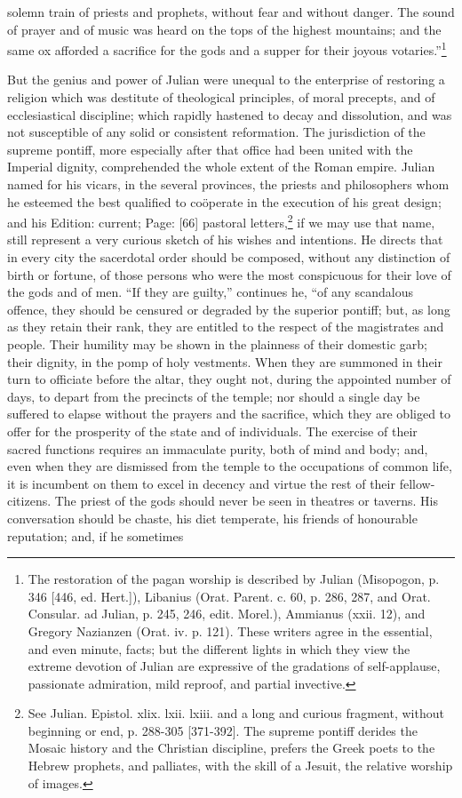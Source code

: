 solemn train of priests and prophets, without fear and without danger. The sound of prayer and of music was heard on the tops of the highest mountains; and the same ox afforded a sacrifice for the gods and a supper for their joyous votaries.\texthebrew{}”\footnote{The restoration of the pagan worship is described by Julian (Misopogon, p. 346 [446, ed. Hert.]), Libanius (Orat. Parent. c. 60, p. 286, 287, and Orat. Consular. ad Julian, p. 245, 246, edit. Morel.), Ammianus (xxii. 12), and Gregory Nazianzen (Orat. iv. p. 121). These writers agree in the essential, and even minute, facts; but the different lights in which they view the extreme devotion of Julian are expressive of the gradations of self-applause, passionate admiration, mild reproof, and partial invective.}

But the genius and power of Julian were unequal to the enterprise of restoring a religion which was destitute of theological principles, of moral precepts, and of ecclesiastical discipline; which rapidly hastened to decay and dissolution, and was not susceptible of any solid or consistent reformation. The jurisdiction of the supreme pontiff, more especially after that office had been united with the Imperial dignity, comprehended the whole extent of the Roman empire. Julian named for his vicars, in the several provinces, the priests and philosophers whom he esteemed the best qualified to coöperate in the execution of his great design; and his Edition: current; Page: [66] pastoral letters,\footnote{See Julian. Epistol. xlix. lxii. lxiii. and a long and curious fragment, without beginning or end, p. 288-305 [371-392]. The supreme pontiff derides the Mosaic history and the Christian discipline, prefers the Greek poets to the Hebrew prophets, and palliates, with the skill of a Jesuit, the relative worship of images.} if we may use that name, still represent a very curious sketch of his wishes and intentions. He directs that in every city the sacerdotal order should be composed, without any distinction of birth or fortune, of those persons who were the most conspicuous for their love of the gods and of men. \texthebrew{“}If they are guilty,\texthebrew{}” continues he, \texthebrew{“}of any scandalous offence, they should be censured or degraded by the superior pontiff; but, as long as they retain their rank, they are entitled to the respect of the magistrates and people. Their humility may be shown in the plainness of their domestic garb; their dignity, in the pomp of holy vestments. When they are summoned in their turn to officiate before the altar, they ought not, during the appointed number of days, to depart from the precincts of the temple; nor should a single day be suffered to elapse without the prayers and the sacrifice, which they are obliged to offer for the prosperity of the state and of individuals. The exercise of their sacred functions requires an immaculate purity, both of mind and body; and, even when they are dismissed from the temple to the occupations of common life, it is incumbent on them to excel in decency and virtue the rest of their fellow-citizens. The priest of the gods should never be seen in theatres or taverns. His conversation should be chaste, his diet temperate, his friends of honourable reputation; and, if he sometimes 